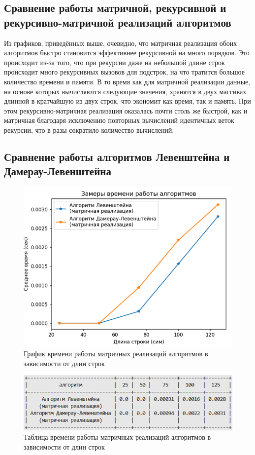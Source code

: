 \subsection{Сравнение работы матричной, рекурсивной и рекурсивно-матричной реализаций алгоритмов}
Из графиков, приведённых выше, очевидно, что матричная реализация обоих алгоритмов быстро становится эффективнее рекурсивной на много порядков. Это происходит из-за того, что при рекурсии даже на небольшой длине строк происходит много рекурсивных вызовов для подстрок, на что тратится большое количество времени и памяти. В то время как для матричной реализации данные, на основе которых вычисляются следующие значения, хранятся в двух массивах длинной в кратчайшую из двух строк, что экономит как время, так и память. При этом рекурсивно-матричная реализация оказалась почти столь же быстрой, как и матричная благодаря исключению повторных вычислений идентичных веток рекурсии, что в разы сократило количество вычислений.
\subsection{Сравнение работы алгоритмов Левенштейна и Дамерау-Левенштейна}
\begin{figure}[H]
    \centering
    \includegraphics[width=1\textwidth]{img/graph_mat.png}
    \caption{График времени работы матричных реализаций алгоритмов в зависимости от длин строк}
\end{figure}
\begin{figure}[H]
    \centering
    \includegraphics[width=1\textwidth]{img/table_mat.png}
    \caption{Таблица времени работы матричных реализаций алгоритмов в зависимости от длин строк}
\end{figure}

